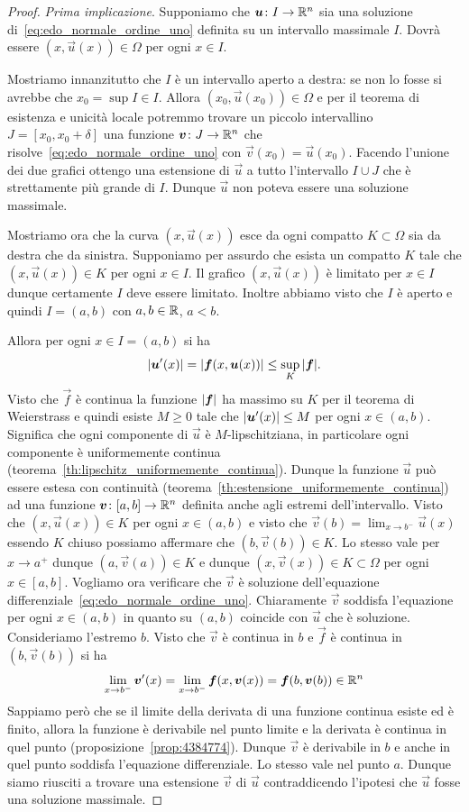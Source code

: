 \begin{proof}
\emph{Prima implicazione}.
Supponiamo che $\boldsymbol u\colon I \to {\mathbb R}^n$ sia una soluzione di~\eqref{eq:edo_normale_ordine_uno} 
definita su un intervallo massimale $I$. Dovrà essere $(x,\vec u(x))\in \Omega$ per ogni $x\in I$.

Mostriamo innanzitutto
che $I$ è un intervallo aperto a destra: se non lo fosse si avrebbe che $x_0=\sup I \in I$. 
Allora $(x_0,\vec u(x_0))\in \Omega$ e per il teorema di esistenza e unicità locale
potremmo trovare un piccolo intervallino $J=[x_0,x_0+\delta]$ una funzione
$\boldsymbol v\colon J\to {\mathbb R}^n$ che risolve~\eqref{eq:edo_normale_ordine_uno}
con $\vec v(x_0)=\vec u(x_0)$.
Facendo l'unione dei due grafici ottengo una estensione di $\vec u$ a tutto l'intervallo
$I\cup J$ che è strettamente più grande di $I$. 
Dunque $\vec u$ non poteva essere una soluzione massimale.

Mostriamo ora che la curva $(x,\vec u(x))$ esce da ogni compatto $K\subset \Omega$ sia da destra che da sinistra. 
Supponiamo per assurdo che esista un compatto $K$ tale che $(x,\vec u(x))\in K$ per ogni $x\in I$.
Il grafico $(x,\vec u(x))$ è limitato per $x\in I$ dunque certamente $I$ deve essere limitato. 
Inoltre abbiamo visto che $I$ è aperto e quindi $I=(a,b)$ con $a,b\in {\mathbb R}$, $a<b$.

Allora per ogni $x\in I=(a,b)$ si ha
\[
  {\left|\boldsymbol u'(x)\right|} = {\left|\boldsymbol f(x, \boldsymbol u(x))\right|}
   \le \sup_K {\left|\boldsymbol f\right|}.
\]
Visto che $\vec f$ è continua 
la funzione ${\left|\boldsymbol f\right|}$ ha massimo su $K$ per il teorema di Weierstrass e quindi esiste 
$M\ge 0$ tale che ${\left|\boldsymbol u'(x)\right|} \le M$ per ogni $x\in (a,b)$. 
Significa che ogni componente di $\vec u$ è $M$-lipschitziana, in particolare
ogni componente è uniformemente continua (teorema~\ref{th:lipschitz_uniformemente_continua}).
Dunque la funzione $\vec u$ può essere estesa con continuità
(teorema~\ref{th:estensione_uniformemente_continua})
ad una funzione $\boldsymbol v \colon [a,b] \to {\mathbb R}^n$ definita anche agli estremi dell'intervallo.
Visto che $(x,\vec u(x)) \in K$ per ogni $x\in(a,b)$ e visto che
$\vec v(b) = \lim_{x\to b^-}\vec u(x)$ essendo $K$ chiuso possiamo affermare che
$(b,\vec v(b)) \in K$.
Lo stesso vale per $x\to a^+$ dunque $(a,\vec v(a))\in K$
e dunque $(x,\vec v(x))\in K \subset \Omega$ per ogni $x\in [a,b]$.
Vogliamo ora verificare che $\vec v$ è soluzione dell'equazione differenziale~\eqref{eq:edo_normale_ordine_uno}.
Chiaramente $\vec v$ soddisfa l'equazione per ogni $x\in (a,b)$
in quanto su $(a,b)$ coincide con $\vec u$ che è soluzione.
Consideriamo l'estremo $b$.
Visto che $\vec v$ è continua in $b$ e $\vec f$ è continua in $(b,\vec v(b))$ si ha
\[
  \lim_{x\to b^-} \boldsymbol v'(x)
  = \lim_{x\to b^-} \boldsymbol f(x,\boldsymbol v(x))
  = \boldsymbol f(b,\boldsymbol v(b)) \in {\mathbb R}^n
\]
Sappiamo però che se il limite della derivata di una funzione continua esiste ed è finito, allora la funzione è derivabile nel punto limite e la derivata è continua in quel punto
(proposizione~\ref{prop:4384774}).
Dunque $\vec v$ è derivabile in $b$ e anche in quel punto soddisfa l'equazione differenziale. Lo stesso vale nel punto $a$. Dunque siamo riusciti a trovare una estensione $\vec v$ di $\vec u$ contraddicendo l'ipotesi che $\vec u$ fosse una soluzione massimale.


\end{proof}

